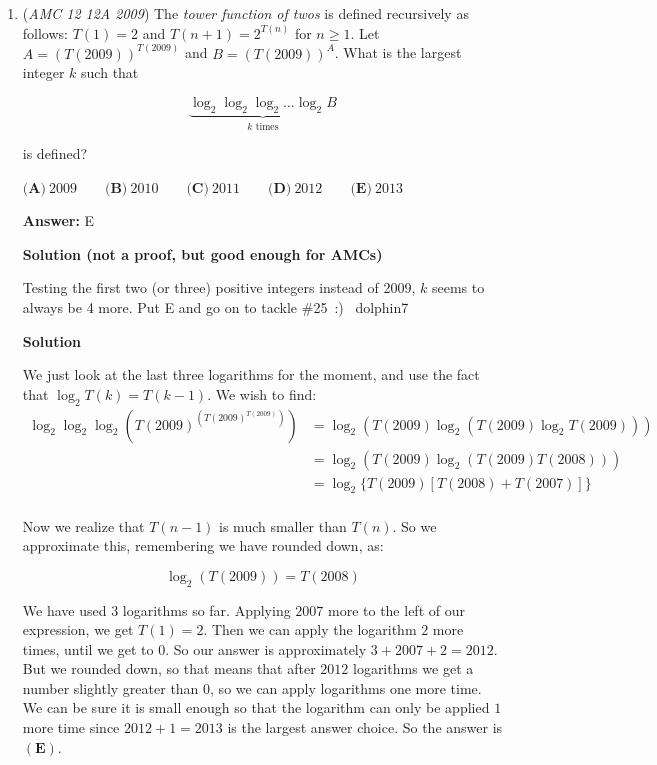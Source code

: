 \begin{enumerate}
 Therefore $x_4-x_1 = 3(150+m) + m = 450+300\sqrt{2}$ $\space$ $450+300+2 = \boxed{752}$

 -cassphe

 


	\item (\textit{AMC 12 12A 2009}) The \textit{tower function of twos} is defined recursively as follows: $T(1) = 2$ and $T(n + 1) = 2^{T(n)}$ for $n\ge1$. Let $A = (T(2009))^{T(2009)}$ and $B = (T(2009))^A$. What is the largest integer $k$ such that


 
 \[\underbrace{\log_2\log_2\log_2\ldots\log_2B}_{k\text{ times}}\]


 is defined?


 $\textbf{(A)}\ 2009\qquad \textbf{(B)}\ 2010\qquad \textbf{(C)}\ 2011\qquad \textbf{(D)}\ 2012\qquad \textbf{(E)}\ 2013$

 \textbf{Answer: }E



\textbf{Solution (not a proof, but good enough for AMCs)}

Testing the first two (or three) positive integers instead of 2009, $k$ seems to always be 4 more. Put E and go on to tackle \#25 :)~ dolphin7

 



\textbf{Solution}

We just look at the last three logarithms for the moment, and use the fact that $\log_2 T(k) = T(k - 1)$. We wish to find:
 \begin{align*} \log_2\log_2\log_2\left({T(2009)^{\left({T(2009)}^{T(2009)}\right)}}\right) &= \log_2(T(2009)\log_2(T(2009)\log_2 T(2009)))\\ &= \log_2(T(2009)\log_2(T(2009)T(2008)))\\ &= \log_2 \{ T(2009) [ T(2008) + T(2007) ] \} \\ \end{align*}


 
Now we realize that $T(n - 1)$ is much smaller than $T(n)$. So we approximate this, remembering we have rounded down, as:

 
 \[\log_2(T(2009)) = T(2008)\]

 We have used $3$ logarithms so far. Applying $2007$ more to the left of our expression, we get $T(1) = 2$. Then we can apply the logarithm $2$ more times, until we get to $0$. So our answer is approximately $3 + 2007 + 2 = 2012$. But we rounded down, so that means that after $2012$ logarithms we get a number slightly greater than $0$, so we can apply logarithms one more time. We can be sure it is small enough so that the logarithm can only be applied $1$ more time since $2012 + 1 = 2013$ is the largest answer choice. So the answer is $\mathbf{(E)}$.


\end{enumerate}
